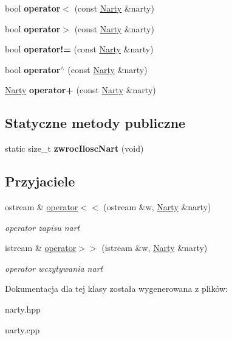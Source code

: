 \begin{DoxyCompactItemize}
\item 
\mbox{\label{class_narty_abd4a3b0f020a2ae9d65668e9dca26d65}} 
bool {\bfseries operator$<$} (const \hyperlink{class_narty}{Narty} \&narty)
\item 
\mbox{\label{class_narty_abd3b42f980291b55ea35e49091aec194}} 
bool {\bfseries operator$>$} (const \hyperlink{class_narty}{Narty} \&narty)
\item 
\mbox{\label{class_narty_a412b7395ba583848b6803d65f747bcb9}} 
bool {\bfseries operator!=} (const \hyperlink{class_narty}{Narty} \&narty)
\item 
\mbox{\label{class_narty_ac18fc5685a7dd1c3fd7e8be18edf869f}} 
bool {\bfseries operator$^\wedge$} (const \hyperlink{class_narty}{Narty} \&narty)
\item 
\mbox{\label{class_narty_a06af67856b6e340325ea906469eec6bd}} 
\hyperlink{class_narty}{Narty} {\bfseries operator+} (const \hyperlink{class_narty}{Narty} \&narty)
\end{DoxyCompactItemize}
\subsection*{Statyczne metody publiczne}
\begin{DoxyCompactItemize}
\item 
\mbox{\label{class_narty_a2f7178d88af8a1939ffa0c546b3ac4ee}} 
static size\+\_\+t {\bfseries zwroc\+Ilosc\+Nart} (void)
\end{DoxyCompactItemize}
\subsection*{Przyjaciele}
\begin{DoxyCompactItemize}
\item 
\mbox{\label{class_narty_adba7206ea101a398967e4a3a71241705}} 
ostream \& \hyperlink{class_narty_adba7206ea101a398967e4a3a71241705}{operator$<$$<$} (ostream \&w, \hyperlink{class_narty}{Narty} \&narty)
\begin{DoxyCompactList}\small\item\em operator zapisu nart \end{DoxyCompactList}\item 
\mbox{\label{class_narty_a1e5081ba475d5503a53492c40e42a4bb}} 
istream \& \hyperlink{class_narty_a1e5081ba475d5503a53492c40e42a4bb}{operator$>$$>$} (istream \&w, \hyperlink{class_narty}{Narty} \&narty)
\begin{DoxyCompactList}\small\item\em operator wczytywania nart \end{DoxyCompactList}\end{DoxyCompactItemize}


Dokumentacja dla tej klasy została wygenerowana z plików\+:\begin{DoxyCompactItemize}
\item 
narty.\+hpp\item 
narty.\+cpp\end{DoxyCompactItemize}
